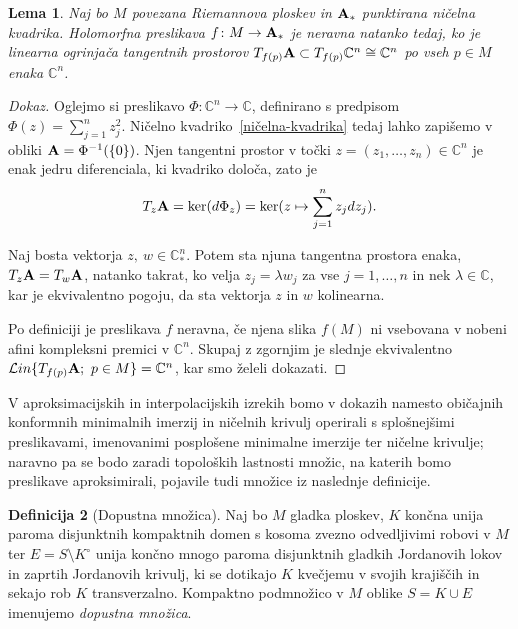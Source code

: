 \documentclass[12pt,a4paper,twoside]{article}
\theoremstyle{definition} %
\newtheorem{definicija}{Definicija}[section]
\newenvironment{dokaz}[1][Dokaz]{\begin{proof}[#1]}{\end{proof}}
\theoremstyle{plain} %
\newtheorem{lema}[definicija]{Lema}
\numberwithin{equation}{section}  %
\newcommand{\C}{\mathbb C}
\begin{document}
\begin{lema} \label{lema:neravna f}
Naj bo $M$ povezana Riemannova ploskev in $\textbf{\textup{A}}_{*}$ punktirana ničelna kvadrika.
Holomorfna preslikava $f \colon M \to \textbf{\textup{A}}_{*}$ je neravna natanko tedaj, ko je linearna ogrinjača tangentnih prostorov 
$T_{f(p)} \textbf{\textup{A}} \subset T_{f(p)} \C^{n} \cong \mathbb{C}^{n}$ po vseh $p \in M$ enaka $\C^{n}$.
\end{lema}

\begin{dokaz}
Oglejmo si preslikavo 
$\Phi \colon \C^{n} \to \C$, definirano s predpisom $\Phi(z) = \sum_{j=1}^{n} z_{j}^{2}$.
Ničelno kvadriko~\eqref{ničelna-kvadrika} tedaj lahko zapišemo v obliki $\textbf{\textup{A}} = \Phi^{-1}( \{0 \} )$.
Njen tangentni prostor v točki $z = (z_{1}, \dots , z_{n}) \in \C^{n}$ je enak jedru diferenciala, ki kvadriko določa, zato je
\[ T_{z} \textbf{\textup{A}} = \ker (d \Phi_{z}) = \ker (z \mapsto \sum_{j=1}^{n} z_{j} dz_{j}). \]

Naj bosta vektorja $z, \ w \in \C_{*}^{n}$. Potem sta njuna tangentna prostora enaka, $ T_{z} \textbf{\textup{A}} = T_{w} \textbf{\textup{A}} $, natanko takrat, ko velja $z_{j} = \lambda w_{j}$ za vse $j = 1, \dots , n$ in nek $\lambda \in \C$, kar je ekvivalentno pogoju, da sta vektorja $z$ in $w$ kolinearna.

Po definiciji je preslikava $f$ neravna, če njena slika $f(M)$ ni vsebovana v nobeni afini kompleksni premici v $\C^{n}$. Skupaj z zgornjim je slednje ekvivalentno 
$ \mathcal{L}in \{T_{f(p)} \textbf{\textup{A}} ; \ p \in M \} = \C^{n}$, kar smo želeli dokazati.
\end{dokaz}

V aproksimacijskih in interpolacijskih izrekih bomo v dokazih namesto običajnih konformnih minimalnih imerzij in ničelnih krivulj operirali s splošnejšimi preslikavami, imenovanimi posplošene minimalne imerzije ter ničelne krivulje; naravno pa se bodo zaradi topoloških lastnosti množic, na katerih bomo preslikave aproksimirali, pojavile tudi množice iz naslednje definicije.

\begin{definicija} [Dopustna množica] \label{def:dopustna-mnozica}
Naj bo $M$ gladka ploskev, $K$ končna unija paroma disjunktnih kompaktnih domen s kosoma zvezno odvedljivimi robovi v $M$ ter $E = S \setminus K^\circ$ unija končno mnogo paroma disjunktnih gladkih Jordanovih lokov in zaprtih Jordanovih krivulj, ki se dotikajo $K$ kvečjemu v svojih krajiščih in sekajo rob $K$ transverzalno. Kompaktno podmnožico v $M$ oblike $S = K \cup E$ imenujemo \emph{dopustna množica}.
\end{definicija}
\end{document}
